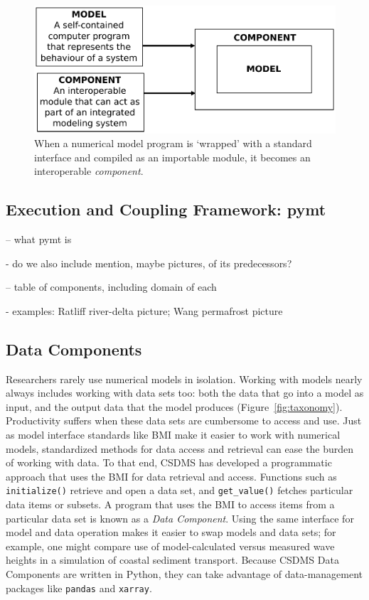 \documentclass[12pt]{amsart}
\begin{document}

\begin{figure}[h!]
\centering
\includegraphics[scale=0.5]{Figures/model_to_component.pdf}
\caption{When a numerical model program is `wrapped' with a standard interface and compiled as an importable module, it becomes an interoperable \textit{component}.}
\label{fig:component}
\end{figure}


\subsection{Execution and Coupling Framework: pymt}
\label{sec:pymt}

-- what pymt is

- do we also include mention, maybe pictures, of its predecessors?

-- table of components, including domain of each

- examples: Ratliff river-delta picture; Wang permafrost picture

\subsection{Data Components}

Researchers rarely use numerical models in isolation. Working with models nearly always includes working with data sets too: both the data that go into a model as input, and the output data that the model produces (Figure~\ref{fig:taxonomy}). Productivity suffers when these data sets are cumbersome to access and use. Just as model interface standards like BMI make it easier to work with numerical models, standardized methods for data access and retrieval can ease the burden of working with data. To that end, CSDMS has developed a programmatic approach that uses the BMI for data retrieval and access. Functions such as \texttt{initialize()} retrieve and open a data set, and \texttt{get\_value()} fetches particular data items or subsets. A program that uses the BMI to access items from a particular data set is known as a \textit{Data Component}. Using the same interface for model and data operation makes it easier to swap models and data sets; for example, one might compare use of model-calculated versus measured wave heights in a simulation of coastal sediment transport. Because CSDMS Data Components are written in Python, they can take advantage of data-management packages like \texttt{pandas} and \texttt{xarray}.
\end{document}

